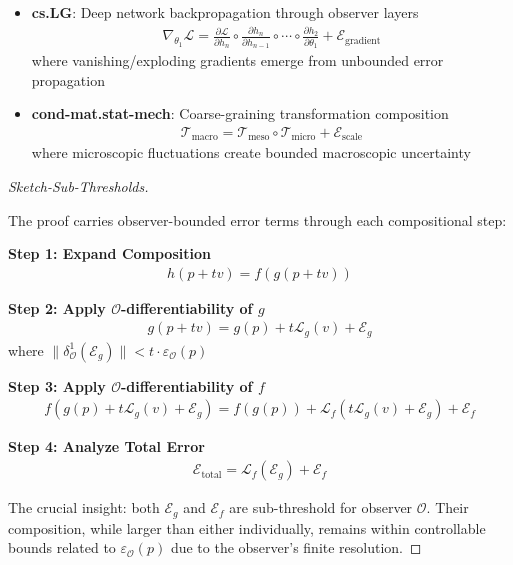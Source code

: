 \begin{theorem}
\begin{itemize}
\item \textbf{cs.LG}: Deep network backpropagation through observer layers
  \begin{align}
  \nabla_{\theta_1} \mathcal{L} = \frac{\partial \mathcal{L}}{\partial h_n} \circ \frac{\partial h_n}{\partial h_{n-1}} \circ \cdots \circ \frac{\partial h_2}{\partial \theta_1} + \mathcal{E}_{\text{gradient}}
  \end{align}
  where vanishing/exploding gradients emerge from unbounded error propagation
  
\item \textbf{cond-mat.stat-mech}: Coarse-graining transformation composition
  \begin{align}
  \mathcal{T}_{\text{macro}} = \mathcal{T}_{\text{meso}} \circ \mathcal{T}_{\text{micro}} + \mathcal{E}_{\text{scale}}
  \end{align}
  where microscopic fluctuations create bounded macroscopic uncertainty
\end{itemize}
\end{theorem}

\begin{proof}[Sketch-Sub-Thresholds]
\label{proof:bk4_sketch_sub_thresholds}

The proof carries observer-bounded error terms through each compositional step:

\textbf{Step 1: Expand Composition}
\begin{align}
h(p + tv) = f(g(p + tv))
\end{align}

\textbf{Step 2: Apply $\mathcal{O}$-differentiability of $g$}
\begin{align}
g(p + tv) = g(p) + t\mathcal{L}_g(v) + \mathcal{E}_g
\end{align}
where $\|\delta^1_{\mathcal{O}}(\mathcal{E}_g)\| < t \cdot \varepsilon_{\mathcal{O}}(p)$

\textbf{Step 3: Apply $\mathcal{O}$-differentiability of $f$}
\begin{align}
f(g(p) + t\mathcal{L}_g(v) + \mathcal{E}_g) = f(g(p)) + \mathcal{L}_f(t\mathcal{L}_g(v) + \mathcal{E}_g) + \mathcal{E}_f
\end{align}

\textbf{Step 4: Analyze Total Error}
\begin{align}
\mathcal{E}_{\text{total}} = \mathcal{L}_f(\mathcal{E}_g) + \mathcal{E}_f
\end{align}

The crucial insight: both $\mathcal{E}_g$ and $\mathcal{E}_f$ are sub-threshold for observer $\mathcal{O}$. Their composition, while larger than either individually, remains within controllable bounds related to $\varepsilon_{\mathcal{O}}(p)$ due to the observer's finite resolution.
\end{proof}

